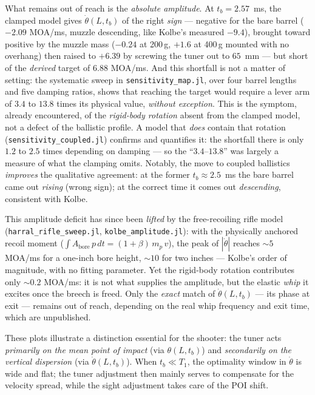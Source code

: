 \documentclass[12pt,a4paper]{article}
\begin{document}
	What remains out of reach is the \emph{absolute amplitude}. At $t_b = 2.57$~ms, the clamped model gives $\dot\theta(L,t_b)$ of the right \emph{sign} --- negative for the bare barrel ($-2.09$ MOA/ms, muzzle descending, like Kolbe's measured $-9.4$), brought toward positive by the muzzle mass ($-0.24$ at 200\,g, $+1.6$ at 400\,g mounted with no overhang) then raised to $+6.39$ by screwing the tuner out to $65$~mm --- but short of the \emph{derived} target of $6.88$ MOA/ms. And this shortfall is not a matter of setting: the systematic sweep in \texttt{sensitivity\_map.jl}, over four barrel lengths and five damping ratios, shows that reaching the target would require a lever arm of $3.4$ to $13.8$ times its physical value, \emph{without exception}. This is the symptom, already encountered, of the \emph{rigid-body rotation} absent from the clamped model, not a defect of the ballistic profile. A model that \emph{does} contain that rotation (\texttt{sensitivity\_coupled.jl}) confirms and quantifies it: the shortfall there is only $1.2$ to $2.5$ times depending on damping --- so the ``$3.4$--$13.8$'' was largely a measure of what the clamping omits. Notably, the move to coupled ballistics \emph{improves} the qualitative agreement: at the former $t_b \approx 2.5$~ms the bare barrel came out \emph{rising} (wrong sign); at the correct time it comes out \emph{descending}, consistent with Kolbe.

	This amplitude deficit has since been \emph{lifted} by the free-recoiling rifle model (\texttt{harral\_rifle\_sweep.jl}, \texttt{kolbe\_amplitude.jl}): with the physically anchored recoil moment ($\int A_\text{bore}\,p\,dt = (1+\beta)\,m_p\,v$), the peak of $|\dot\theta|$ reaches $\sim 5$ MOA/ms for a one-inch bore height, $\sim 10$ for two inches --- Kolbe's order of magnitude, with no fitting parameter. Yet the rigid-body rotation contributes only $\sim 0.2$ MOA/ms: it is not what supplies the amplitude, but the elastic \emph{whip} it excites once the breech is freed. Only the \emph{exact} match of $\dot\theta(L,t_b)$ --- its phase at exit --- remains out of reach, depending on the real whip frequency and exit time, which are unpublished.

	These plots illustrate a distinction essential for the shooter: the tuner acts \emph{primarily on the mean point of impact} (via $\theta(L,t_b)$) and \emph{secondarily on the vertical dispersion} (via $\dot\theta(L,t_b)$). When $t_b \ll T_1$, the optimality window in $\dot\theta$ is wide and flat; the tuner adjustment then mainly serves to compensate for the velocity spread, while the sight adjustment takes care of the POI shift.
\end{document}
